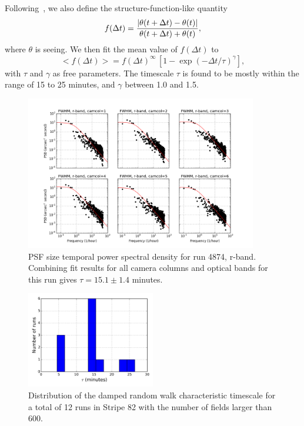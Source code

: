Following~\cite{Racine1996}, we also define the structure-function-like quantity
\begin{equation}
       f(\Delta t) = {| \theta(t+\Delta t) - \theta(t)| \over  \theta(t+\Delta t) + \theta(t) },
\end{equation} 
where $\theta$ is seeing.
We then fit the mean value of $f(\Delta t)$ to 
\begin{equation}
    < f(\Delta t) > =  f(\Delta t) ^\infty \, \left[ 1 - \exp(-\Delta t/\tau)^\gamma \right],
\end{equation} 
with $\tau$ and $\gamma$ as free parameters.
The timescale $\tau$ is found to be mostly within the range of 15 to
25 minutes, and $\gamma$ between 1.0 and 1.5.

\begin{figure}
\centering
\includegraphics[width=0.9\textwidth]{FIGURES/temporalPSD.png}
\caption{PSF size temporal power spectral density for run 4874, r-band. 
Combining fit results for all camera columns and optical bands for
this run
gives $\tau = 15.1 \pm 1.4$ minutes.
\label{fig:psd}}
\end{figure}

\begin{figure}
\centering
\includegraphics[width=0.5\textwidth]{FIGURES/hist.png}
\caption{Distribution of the damped random walk characteristic
  timescale for a total of 12 runs in Stripe 82 with the number of
  fields larger than 600.
\label{fig:hist}}
\end{figure}

